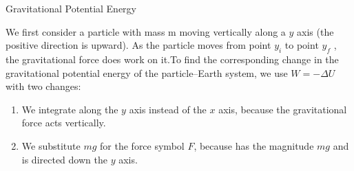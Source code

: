 \documentclass[18pt]{LectMechanics}
\begin{document}
\begin{frame}{Gravitational Potential Energy}{}
	\begin{minipage}{0.7\linewidth}
		We first consider a particle with mass m moving vertically along a $y$ axis (the positive direction is upward). As the particle moves from point $y_i$ to point $y_f$ , the gravitational force does work on it.To find the corresponding change in the gravitational potential energy of the particle–Earth system, we use $W = -\Delta U$ with two changes:
	\end{minipage}%
	\begin{minipage}{0.3\linewidth}\centering
		\begin{center}
		\end{center}
	\end{minipage}

	\begin{enumerate}
		\item  We integrate along the $y$ axis instead of the $x$ axis, because the gravitational force acts vertically.
		\item We substitute $mg$ for the force symbol $F$, because has the magnitude $mg$ and is directed down the $y$ axis.
	\end{enumerate}

\end{frame}
\end{document}
